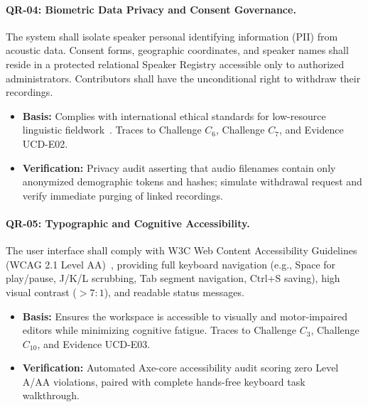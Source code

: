 \documentclass[conference]{IEEEtran}
\begin{document}
\paragraph{QR-04: Biometric Data Privacy and Consent Governance.}
The system shall isolate speaker personal identifying information (PII) from acoustic data. Consent forms, geographic coordinates, and speaker names shall reside in a protected relational Speaker Registry accessible only to authorized administrators. Contributors shall have the unconditional right to withdraw their recordings.
\begin{itemize}
    \item \textbf{Basis:} Complies with international ethical standards for low-resource linguistic fieldwork~\cite{carroll2020care}. Traces to Challenge $C_6$, Challenge $C_7$, and Evidence UCD-E02.
    \item \textbf{Verification:} Privacy audit asserting that audio filenames contain only anonymized demographic tokens and hashes; simulate withdrawal request and verify immediate purging of linked recordings.
\end{itemize}

\paragraph{QR-05: Typographic and Cognitive Accessibility.}
The user interface shall comply with W3C Web Content Accessibility Guidelines (WCAG 2.1 Level AA)~\cite{w3c2018wcag}, providing full keyboard navigation (e.g., Space for play/pause, J/K/L scrubbing, Tab segment navigation, Ctrl+S saving), high visual contrast ($>7:1$), and readable status messages.
\begin{itemize}
    \item \textbf{Basis:} Ensures the workspace is accessible to visually and motor-impaired editors while minimizing cognitive fatigue. Traces to Challenge $C_3$, Challenge $C_{10}$, and Evidence UCD-E03.
    \item \textbf{Verification:} Automated Axe-core accessibility audit scoring zero Level A/AA violations, paired with complete hands-free keyboard task walkthrough.
\end{itemize}
\end{document}
